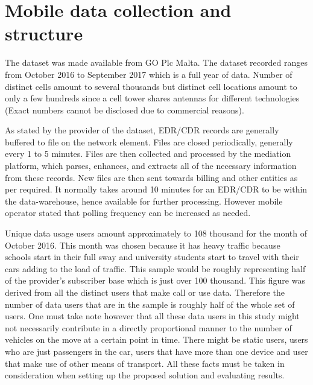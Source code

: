 \documentclass[12pt, a4paper]{report}
\theoremstyle{definition}
\theoremstyle{definition}%
\theoremstyle{definition}%
\theoremstyle{definition}%
\theoremstyle{definition}%
\theoremstyle{definition}%
\begin{document}
\section{Mobile data collection and structure} \label{section:methodology:mobile_data_collection_structure}

The dataset was made available from GO Plc Malta. The dataset recorded ranges from October 2016 to September 2017 which is a full year of data. Number of distinct cells amount to several thousands but distinct cell locations amount to only a few hundreds since a cell tower shares antennas for different technologies (Exact numbers cannot be disclosed due to commercial reasons).

As stated by the provider of the dataset, EDR/CDR records are generally buffered to file on the network element. Files are closed periodically, generally every 1 to 5 minutes. Files are then collected and processed by the mediation platform, which parses, enhances, and extracts all of the necessary information from these records. New files are then sent towards billing and other entities as per required. It normally takes around 10 minutes for an EDR/CDR to be within the data-warehouse, hence available for further processing. However mobile operator stated that polling frequency can be increased as needed.

Unique data usage users amount approximately to 108 thousand for the month of October 2016. This month was chosen because it has heavy traffic because schools start in their full sway and university students start to travel with their cars adding to the load of traffic. This sample would be roughly representing half of the provider's subscriber base which is just over 100 thousand. This figure was derived from all the distinct users that make call or use data. Therefore the number of data users that are in the sample is roughly half of the whole set of users. One must take note however that all these data users in this study might not necessarily contribute in a directly proportional manner to the number of vehicles on the move at a certain point in time. There might be static users, users who are just passengers in the car, users that have more than one device and user that make use of other means of transport. All these facts must be taken in consideration when setting up the proposed solution and evaluating results.

\end{document}
